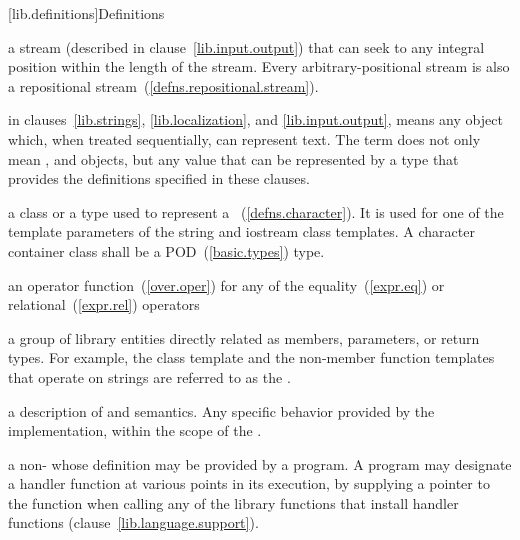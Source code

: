 [lib.definitions]{Definitions}

%
a stream (described in clause~\ref{lib.input.output}) that can seek to any integral position within
the length of the stream.
Every arbitrary-positional stream is also a repositional stream~(\ref{defns.repositional.stream}).

%
in clauses~\ref{lib.strings}, \ref{lib.localization}, and
\ref{lib.input.output}, means any object which,
when treated sequentially, can represent text.
The term does not only mean , and  objects,
but any value that can be represented by a type
that provides the definitions specified in these clauses.

%
a class or a type used to represent a
~(\ref{defns.character}).
It is used for one of the template parameters of the string and
iostream class templates.
A character container class shall be a POD~(\ref{basic.types}) type.

%
an operator function~(\ref{over.oper}) for any of the equality~(\ref{expr.eq}) or
relational~(\ref{expr.rel}) operators

%
a group of library entities directly related as members, parameters, or
return types.
For example, the class template
and the non-member function templates that operate on
strings are referred to as the
.

%
a description of
and
semantics.
Any specific behavior provided by the implementation,
within the scope of the
.

%
a non-
whose definition may be provided by a \Cpp program.
A \Cpp program may designate a handler function at various points in its execution, by
supplying a pointer to the function when calling any of the library functions that install
handler functions (clause~\ref{lib.language.support}).

